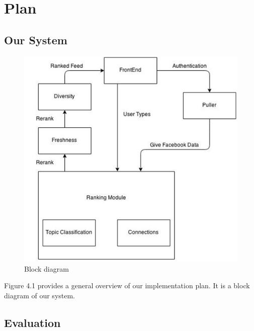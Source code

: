 
\chapter{Plan}\label{ch:plan}


\section{Our System}

\begin{figure}[bp!]
\centering
\graphicspath{{images/} }
\includegraphics[scale=0.5]{blockdiagram.jpg}
\caption{Block diagram}
\end{figure}

Figure 4.1 provides a general overview of our implementation plan. It is a block diagram of our system. 

\section {Evaluation}

